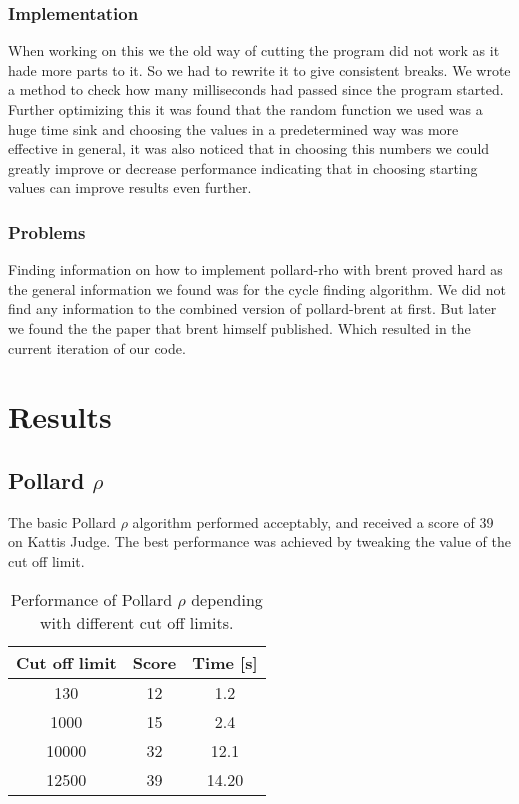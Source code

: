\documentclass[a4paper, 12pt]{report}
\begin{document}
\subsection{Implementation}
When working on this we the old way of cutting the program did not work as it hade more parts to it. So we had to rewrite it to give consistent breaks. We wrote a method to check how many milliseconds had passed since the program started. Further optimizing this it was found that the random function we used was a huge time sink and choosing the values in a predetermined way was more effective in general, it was also noticed that in choosing this numbers we could greatly improve or decrease performance indicating that in choosing starting values can improve results even further.

\subsection{Problems}
Finding information on how to implement pollard-rho with brent proved hard as the general information we found was for the cycle finding algorithm. We did not find any information to the combined version of pollard-brent at first. But later we found the the paper that brent himself published. Which resulted in the current iteration of our code\cite{brentpdf}.
\chapter{Results}

\section{Pollard $\rho$}
The basic Pollard $\rho$ algorithm performed acceptably, and received a score of 39 on Kattis Judge. The best performance was achieved by tweaking the value of the cut off limit.
\begin{table}[ht]
\caption{Performance of Pollard $\rho$ depending with different cut off limits.}
\begin{tabular} {c c c}
Cut off limit 	&	 Score 	& Time [s] \\ \hline
130		&	12		& 1.2 \\
1000	&	15		& 2.4 \\
10000 	& 	32		& 12.1 \\
12500	&	39		&14.20 \\

\end{tabular}
\end{table}
\end{document}
